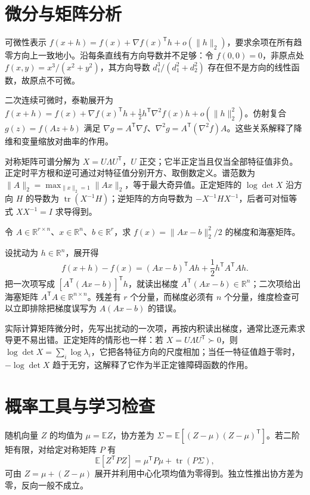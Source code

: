 \documentclass[UTF8,12pt,a4paper,fontset=fandol]{ctexbook}
\begin{document}
\section{微分与矩阵分析}

可微性表示 $f(x+h)=f(x)+\nabla f(x)^{\mathsf T}h+o(\|h\|_2)$，要求余项在所有趋零方向上一致地小。沿每条直线有方向导数并不足够：令 $f(0,0)=0$，非原点处 $f(x,y)=x^3/(x^2+y^2)$，其方向导数 $d_1^3/(d_1^2+d_2^2)$ 存在但不是方向的线性函数，故原点不可微。

二次连续可微时，泰勒展开为 $f(x+h)=f(x)+\nabla f(x)^{\mathsf T}h+\tfrac12h^{\mathsf T}\nabla^2f(x)h+o(\|h\|_2^2)$。仿射复合 $g(z)=f(Az+b)$ 满足 $\nabla g=A^{\mathsf T}\nabla f$、$\nabla^2g=A^{\mathsf T}(\nabla^2f)A$。这些关系解释了降维和变量缩放对曲率的作用。

对称矩阵可谱分解为 $X=U\Lambda U^{\mathsf T}$，$U$ 正交；它半正定当且仅当全部特征值非负。正定时平方根和逆可通过对特征值分别开方、取倒数定义。谱范数为 $\|A\|_2=\max_{\|x\|_2=1}\|Ax\|_2$，等于最大奇异值。正定矩阵的 $\log\det X$ 沿方向 $H$ 的导数为 $\operatorname{tr}(X^{-1}H)$；逆矩阵的方向导数为 $-X^{-1}HX^{-1}$，后者可对恒等式 $XX^{-1}=I$ 求导得到。

\begin{example}[最小二乘梯度的维度与推导]
令 $A\in\mathbb R^{r\times n}$、$x\in\mathbb R^n$、$b\in\mathbb R^r$，求 $f(x)=\|Ax-b\|_2^2/2$ 的梯度和海塞矩阵。
\end{example}
\begin{solve}
设扰动为 $h\in\mathbb R^n$，展开得
\[
 f(x+h)-f(x)=(Ax-b)^{\mathsf T}Ah+\frac12h^{\mathsf T}A^{\mathsf T}Ah.
\]
把一次项写成 $[A^{\mathsf T}(Ax-b)]^{\mathsf T}h$，就读出梯度 $A^{\mathsf T}(Ax-b)\in\mathbb R^n$；二次项给出海塞矩阵 $A^{\mathsf T}A\in\mathbb R^{n\times n}$。残差有 $r$ 个分量，而梯度必须有 $n$ 个分量，维度检查可以立即排除把梯度误写为 $A(Ax-b)$ 的错误。
\end{solve}

实际计算矩阵微分时，先写出扰动的一次项，再按内积读出梯度，通常比逐元素求导更不易出错。正定矩阵的情形也一样：若 $X=U\Lambda U^{\mathsf T}\succ0$，则 $\log\det X=\sum_i\log\lambda_i$，它把各特征方向的尺度相加；当任一特征值趋于零时，$-\log\det X$ 趋于无穷，这解释了它作为半正定锥障碍函数的作用。

\section{概率工具与学习检查}

随机向量 $Z$ 的均值为 $\mu=\mathbb EZ$，协方差为 $\Sigma=\mathbb E[(Z-\mu)(Z-\mu)^{\mathsf T}]$。若二阶矩有限，对给定对称矩阵 $P$ 有
\[
 \mathbb E[Z^{\mathsf T}PZ]=\mu^{\mathsf T}P\mu+\operatorname{tr}(P\Sigma),
\]
可由 $Z=\mu+(Z-\mu)$ 展开并利用中心化项均值为零得到。独立性推出协方差为零，反向一般不成立。
\end{document}

